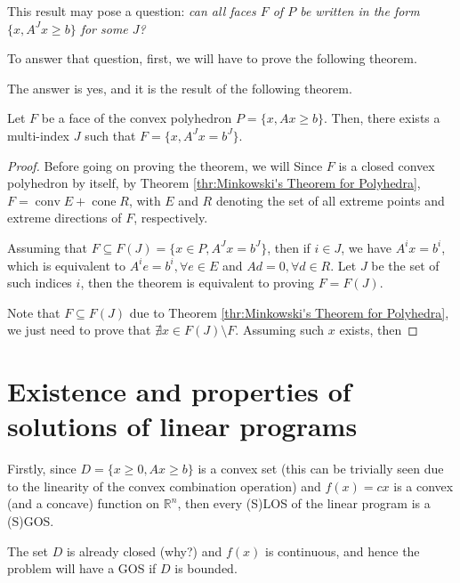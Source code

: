 This result may pose a question: \textit{can all faces \( F \) of \( P \) be
written in the form \( \{x, A^{J}x \ge  b\}  \) for some \( J \)?}

To answer that question, first, we will have to prove the following theorem.

\begin{theorem}
\label{thr:Faces and exposed faces in convex polyhedra}
  
\end{theorem}

The answer is yes, and it is the result of the following theorem.

\begin{theorem}
\label{thr:Face representation theorem}
  Let \( F \) be a face of the convex polyhedron \( P = \{x, Ax \ge  b\}   \). Then,
  there exists a multi-index \( J \) such that \( F = \{x, A^{J}x = b^{J}\}
  \).
\end{theorem}

\begin{proof}
  Before going on proving the theorem, we will 
  Since \( F \) is a closed convex polyhedron by itself, by
  Theorem \ref{thr:Minkowski's Theorem for Polyhedra}, \( F =
  \operatorname{conv} E + \operatorname{cone} R \),
  with \( E \) and \( R \) denoting the set of all
  extreme points and extreme directions of \( F \), respectively.

  Assuming that \( F \subseteq F(J) = \{ x \in P, A^{J}x = b^{J}\}   \), then if
  \( i \in J \), we have \( A^{i}x = b^{i} \), which is equivalent to \( A^{i}e
  = b^{i}, \forall e \in E\) and \( Ad = 0, \forall d \in R \). Let \( J \) be
  the set of such indices \( i \), then the theorem is equivalent to proving \(
  F = F(J)\).

  Note that \( F \subseteq F(J) \) due to Theorem \ref{thr:Minkowski's Theorem
  for Polyhedra}, we just need to prove that \( \nexists x \in F(J) \setminus
  F\). Assuming such \( x \) exists, then
\end{proof}

\section{Existence and properties of solutions of linear programs} %
\label{sec:Existence and properties of solutions of linear programs}

Firstly, since \( D = \{x\ge 0, Ax \ge  b\}   \) is a convex set (this can be
trivially seen due to the linearity of the convex combination operation) and \(
f(x)=cx\) is a convex (and a concave) function on \( \mathbb{R}^{n} \), then
every (S)LOS of the linear program is a (S)GOS.

The set \( D \) is already closed (why?) and \( f(x) \) is continuous, and hence
the problem will have a GOS if \( D \) is bounded.



